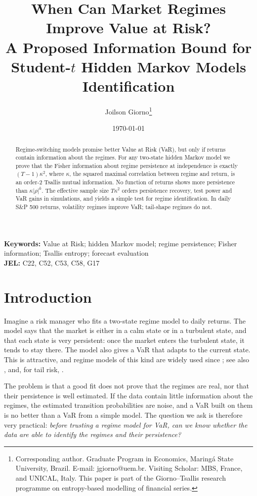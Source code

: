 \documentclass[12pt,letterpaper]{article}
\title{When Can Market Regimes Improve Value at Risk?\\
A Proposed Information Bound for Student-$t$ Hidden Markov Models Identification}
\author{Joilson Giorno\thanks{\protect\setstretch{1}\protect\fontsize{9}{11}\selectfont Corresponding author. Graduate Program in Economics, Maring\'a State University,  Brazil. E-mail: jgiorno@uem.br. Visiting Scholar: MBS, France, and UNICAL, Italy. This paper is part of the Giorno--Tsallis research programme on entropy-based modelling of financial series.}}
\date{\today}
\theoremstyle{plain}
\theoremstyle{remark}
\begin{document}
\maketitle

\begin{abstract}
\noindent Regime-switching models promise better Value at Risk (VaR), but only if returns contain information about the regimes. For any two-state hidden Markov model we prove that the Fisher information about regime persistence at independence is exactly $(T-1)\kappa^2$, where $\kappa$, the squared maximal correlation between regime and return, is an order-2 Tsallis mutual information. No function of returns shows more persistence than $\kappa|\rho|^k$. The effective sample size $T\kappa^2$ orders persistence recovery, test power and VaR gains in simulations, and yields a simple test for regime identification. In daily S\&P 500 returns, volatility regimes improve VaR; tail-shape regimes do not.
\end{abstract}

\noindent\textbf{Keywords:} Value at Risk; hidden Markov model; regime persistence; Fisher information; Tsallis entropy; forecast evaluation\\
\textbf{JEL:} C22, C52, C53, C58, G17
\newpage

\section{Introduction}\label{sec:intro}

Imagine a risk manager who fits a two-state regime model to daily returns. The model says that the market is either in a calm state or in a turbulent state, and that each state is very persistent: once the market enters the turbulent state, it tends to stay there. The model also gives a VaR that adapts to the current state. This is attractive, and regime models of this kind are widely used since \citet{hamilton1989}; see also \citet{gray1996}, \citet{haas2004} and, for tail risk, \citet{saidane2026}.

The problem is that a good fit does not prove that the regimes are real, nor that their persistence is well estimated. If the data contain little information about the regimes, the estimated transition probabilities are noise, and a VaR built on them is no better than a VaR from a simple model. The question we ask is therefore very practical: \emph{before trusting a regime model for VaR, can we know whether the data are able to identify the regimes and their persistence?}
\end{document}
